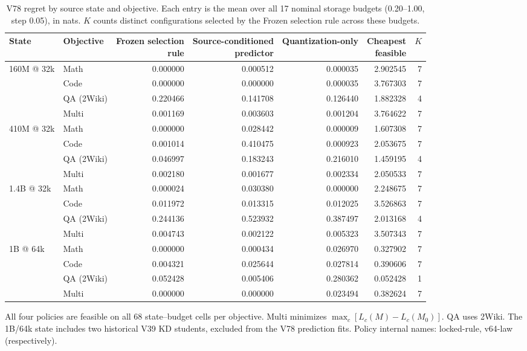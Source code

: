 \begin{table}[H]
\centering\small
\setlength{\tabcolsep}{3pt}
\caption{V78 regret by source state and objective. Each entry is the mean over all 17 nominal storage budgets (0.20--1.00, step 0.05), in nats. $K$ counts distinct configurations selected by the Frozen selection rule across these budgets.}
\label{tab:rule-confirm-by-state}
\begin{tabular}{llrrrrr}
\toprule
State & Objective & \shortstack{Frozen selection\\rule} & \shortstack{Source-conditioned\\predictor} & Quantization-only & \shortstack{Cheapest\\feasible} & $K$ \\
\midrule
160M @ 32k & Math & 0.000000 & 0.000512 & 0.000035 & 2.902545 & 7 \\
 & Code & 0.000000 & 0.000000 & 0.000035 & 3.767303 & 7 \\
 & QA (2Wiki) & 0.220466 & 0.141708 & 0.126440 & 1.882328 & 4 \\
 & Multi & 0.001169 & 0.003603 & 0.001204 & 3.764622 & 7 \\
\midrule
410M @ 32k & Math & 0.000000 & 0.028442 & 0.000009 & 1.607308 & 7 \\
 & Code & 0.001014 & 0.410475 & 0.000923 & 2.053675 & 7 \\
 & QA (2Wiki) & 0.046997 & 0.183243 & 0.216010 & 1.459195 & 4 \\
 & Multi & 0.002180 & 0.001677 & 0.002334 & 2.050533 & 7 \\
\midrule
1.4B @ 32k & Math & 0.000024 & 0.030380 & 0.000000 & 2.248675 & 7 \\
 & Code & 0.011972 & 0.013315 & 0.012025 & 3.526863 & 7 \\
 & QA (2Wiki) & 0.244136 & 0.523932 & 0.387497 & 2.013168 & 4 \\
 & Multi & 0.004743 & 0.002122 & 0.005323 & 3.507343 & 7 \\
\midrule
1B @ 64k & Math & 0.000000 & 0.000434 & 0.026970 & 0.327902 & 7 \\
 & Code & 0.004321 & 0.025644 & 0.027814 & 0.390606 & 7 \\
 & QA (2Wiki) & 0.052428 & 0.005406 & 0.280362 & 0.052428 & 1 \\
 & Multi & 0.000000 & 0.000000 & 0.023494 & 0.382624 & 7 \\
\bottomrule
\end{tabular}
\par\smallskip\begin{minipage}{\linewidth}\footnotesize
All four policies are feasible on all 68 state--budget cells per objective. Multi minimizes $\max_c[L_c(M)-L_c(M_0)]$. QA uses 2Wiki. The 1B/64k state includes two historical V39 KD students, excluded from the V78 prediction fits. Policy internal names: locked-rule, v64-law (respectively).
\end{minipage}
\end{table}

